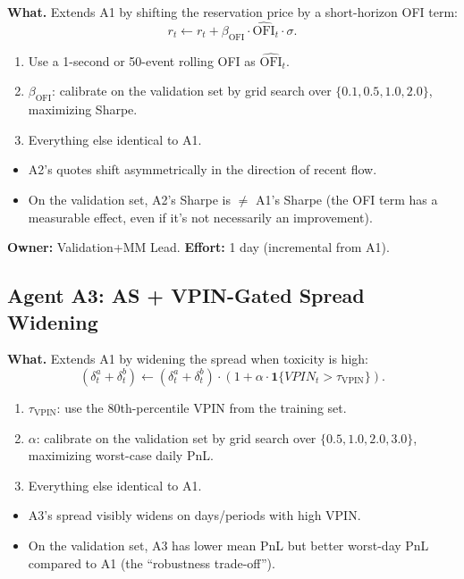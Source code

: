 \documentclass[11pt,a4paper]{article}
\begin{document}
\textbf{What.}
Extends A1 by shifting the reservation price by a short-horizon OFI term:
\[
  r_t \leftarrow r_t + \beta_{\text{OFI}} \cdot \widehat{\text{OFI}}_t \cdot \sigma.
\]

\begin{enumerate}[nosep]
  \item Use a 1-second or 50-event rolling OFI as $\widehat{\text{OFI}}_t$.
  \item $\beta_{\text{OFI}}$: calibrate on the validation set by grid search over $\{0.1, 0.5, 1.0, 2.0\}$, maximizing Sharpe.
  \item Everything else identical to A1.
\end{enumerate}

\begin{successbox}
  \begin{itemize}[nosep]
    \item A2's quotes shift asymmetrically in the direction of recent flow.
    \item On the validation set, A2's Sharpe is $\neq$ A1's Sharpe (the OFI term has a measurable effect, even if it's not necessarily an improvement).
  \end{itemize}
\end{successbox}

\textbf{Owner:} Validation+MM Lead. \quad \textbf{Effort:} 1 day (incremental from A1).

\subsection{Agent A3: AS + VPIN-Gated Spread Widening}

\textbf{What.}
Extends A1 by widening the spread when toxicity is high:
\[
  (\delta^a_t + \delta^b_t) \leftarrow (\delta^a_t + \delta^b_t) \cdot \left(1 + \alpha \cdot \mathbf{1}\{VPIN_t > \tau_{\text{VPIN}}\}\right).
\]

\begin{enumerate}[nosep]
  \item $\tau_{\text{VPIN}}$: use the 80th-percentile VPIN from the training set.
  \item $\alpha$: calibrate on the validation set by grid search over $\{0.5, 1.0, 2.0, 3.0\}$, maximizing worst-case daily PnL.
  \item Everything else identical to A1.
\end{enumerate}

\begin{successbox}
  \begin{itemize}[nosep]
    \item A3's spread visibly widens on days/periods with high VPIN.
    \item On the validation set, A3 has lower mean PnL but better worst-day PnL compared to A1 (the ``robustness trade-off'').
  \end{itemize}
\end{successbox}
\end{document}

